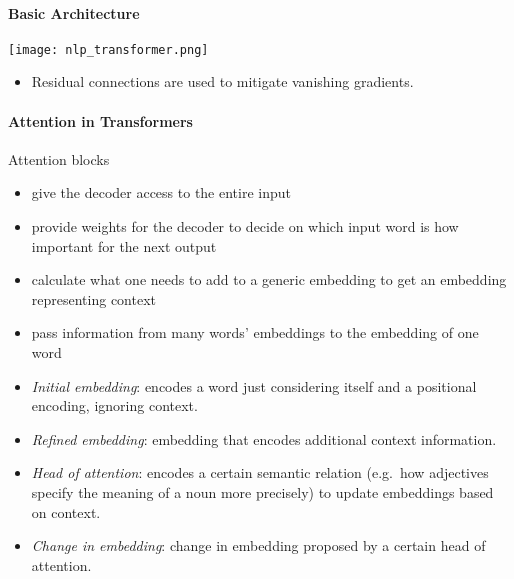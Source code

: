 \paragraph{Basic Architecture}
\begin{center}
    \texttt{[image: nlp\_transformer.png]}
\end{center}

\newpar{}
\begin{itemize}
    \item Residual connections are used to mitigate vanishing gradients.
\end{itemize}

\paragraph{Attention in Transformers}
\newpar{}

Attention blocks
\begin{itemize}
    \item give the decoder access to the entire input 
    \item provide weights for the decoder to decide on which input word is how important for the next output
    \item calculate what one needs to add to a generic embedding to get an embedding representing context
    \item pass information from many words' embeddings to the embedding of one word
\end{itemize}

\newpar{}
\begin{itemize}
    \item \textit{Initial embedding}: encodes a word just considering itself and a positional encoding, ignoring context.
    \item \textit{Refined embedding}: embedding that encodes additional context information.
    \item \textit{Head of attention}: encodes a certain semantic relation (e.g.\ how adjectives specify the meaning of a noun more precisely) to update embeddings based on context.
    \item \textit{Change in embedding}: change in embedding proposed by a certain head of attention.
\end{itemize}

